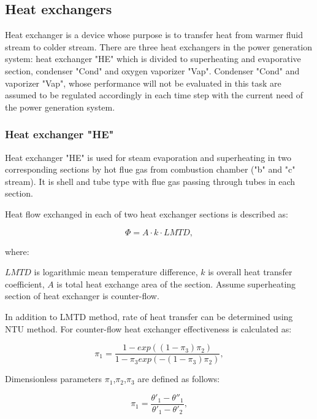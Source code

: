 \documentclass[openany]{book}
\begin{document}
	\subsection{Heat exchangers}
	
	Heat exchanger is a device whose purpose is to transfer heat from warmer 
	fluid stream to colder stream. There are three heat exchangers in the power 
	generation system: heat exchanger "HE" which is divided to superheating and 
	evaporative section, condenser "Cond" and oxygen vaporizer "Vap". Condenser 
	"Cond" and vaporizer "Vap", whose performance will not be evaluated in this 
	task are assumed to be regulated accordingly in each time step with the 
	current need of the power generation system. 
	
	\subsubsection*{Heat exchanger "HE"}
	
	Heat exchanger "HE" is used for steam evaporation and superheating in two 
	corresponding sections by hot flue gas from combustion chamber ("b" and "c" 
	stream). It is shell and tube type with flue gas passing through tubes in 
	each section. 
	
	Heat flow exchanged in each of two heat exchanger sections is described as:
	
	\begin{equation}\label{eq:heat_flow}
	\Phi = A \cdot k \cdot LMTD,
	\end{equation}
	
	where:
	
	\noindent
	$LMTD$ is logarithmic mean temperature difference, 
	$k$ is overall heat transfer coefficient,
	$A$ is total heat exchange area of the section. 
	Assume superheating section of heat exchanger is counter-flow.
	
	In addition to LMTD method, rate of heat transfer can be determined using 
	NTU method. For counter-flow heat exchanger effectiveness is calculated as:
	
	\begin{equation}\label{eq:heat_exchanger_eff}
	\pi_1 = \frac{1 - exp((1-\pi_3)\pi_2)}{1-\pi_3exp(-(1-\pi_3)\pi_2)},
	\end{equation}
	
	Dimensionless parameters $\pi_1$,$\pi_2$,$\pi_3$ are defined as follows:
	
	\begin{equation}\label{eq:pi_params}
	\pi_1 = \frac{\theta'_1 - \theta''_1}{\theta'_1 - \theta'_2},
	\end{equation}
	
\end{document}
